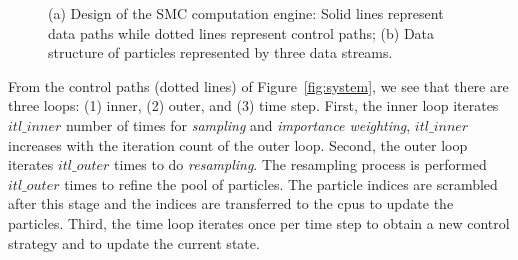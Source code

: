 \setcounter{subfigure}{0}
\begin{figure}[t!]
\centering
{}
\caption{(a) Design of the SMC computation engine: Solid lines represent data paths while dotted lines represent control paths; (b) Data structure of particles represented by three data streams.}
\end{figure}

From the control paths (dotted lines) of Figure~\ref{fig:system}, we see that there are three loops: 
(1) inner, (2) outer, and (3) time step.
First, the inner loop iterates $itl\_inner$ number of times for \textit{sampling} and \textit{importance weighting},
$itl\_inner$ increases with the iteration count of the outer loop.
Second, the outer loop iterates $itl\_outer$ times to do \textit{resampling}.
The resampling process is performed $itl\_outer$ times to refine the pool of particles.
The particle indices are scrambled after this stage and the indices are transferred to the \glspl{cpu} to update the particles.
Third, the time loop iterates once per time step to obtain a new control strategy and to update the current state.

